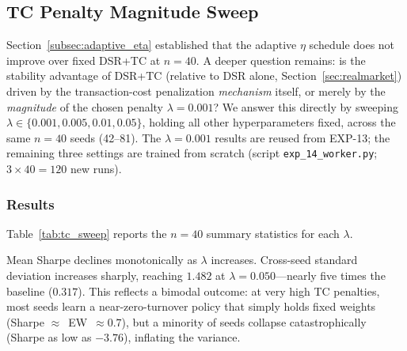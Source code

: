 \documentclass[conference]{IEEEtran}
\begin{document}
\subsection{TC Penalty Magnitude Sweep}
\label{subsec:tc_sweep}

Section~\ref{subsec:adaptive_eta} established that the adaptive
$\eta$ schedule does not improve over fixed DSR+TC at $n=40$.
A deeper question remains: is the stability advantage of DSR+TC
(relative to DSR alone, Section~\ref{sec:realmarket}) driven
by the transaction-cost penalization \emph{mechanism} itself,
or merely by the \emph{magnitude} of the chosen penalty
$\lambda=0.001$? We answer this directly by sweeping
$\lambda \in \{0.001, 0.005, 0.01, 0.05\}$, holding all other
hyperparameters fixed, across the same $n=40$ seeds (42--81).
The $\lambda=0.001$ results are reused from EXP-13;
the remaining three settings are trained from scratch
(script \texttt{exp\_14\_worker.py}; $3 \times 40 = 120$ new runs).

\subsubsection{Results}

Table~\ref{tab:tc_sweep} reports the $n=40$ summary statistics
for each $\lambda$.

\begin{table}[t]
\caption{TC Penalty Sweep: DSR+TC with $\lambda \in \{0.001,0.005,0.01,0.05\}$, $n=40$ seeds}
\label{tab:tc_sweep}
\centering
{}
\end{table}

Mean Sharpe declines monotonically as $\lambda$ increases.
Cross-seed standard deviation increases sharply, reaching
$1.482$ at $\lambda=0.050$---nearly five times the baseline
($0.317$). This reflects a bimodal outcome: at very high TC
penalties, most seeds learn a near-zero-turnover policy
that simply holds fixed weights (Sharpe $\approx$~EW~$\approx 0.7$),
but a minority of seeds collapse catastrophically (Sharpe
as low as $-3.76$), inflating the variance.
\end{document}
